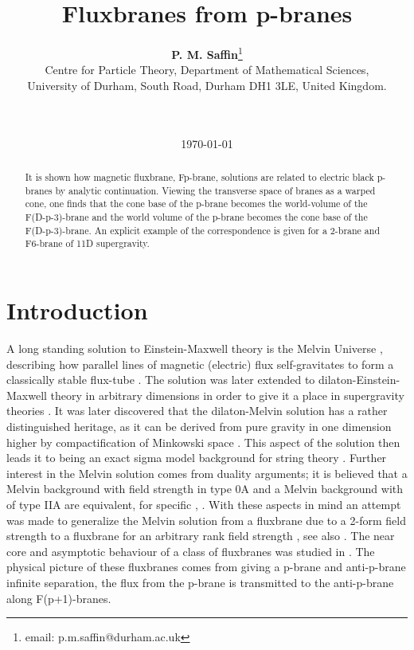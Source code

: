 \documentclass[a4paper,11pt]{article}
\title{{\bf Fluxbranes from p-branes}}
\author{{\bf P. M. Saffin}\thanks{email: p.m.saffin@durham.ac.uk}
\\ Centre for Particle Theory, Department of Mathematical Sciences, \\
University of Durham, South Road, Durham DH1 3LE, 
United Kingdom.\\
\\ \\ 
}
\date{\today}
\begin{document}
\maketitle
\begin{abstract}
It is shown how
magnetic fluxbrane, Fp-brane, solutions 
are related to electric
black p-branes by analytic continuation. Viewing 
the transverse space of branes as a warped cone, one finds that
the cone base of the p-brane
becomes the world-volume of the F(D-p-3)-brane and the
world volume of the p-brane becomes the cone base of
the F(D-p-3)-brane.
An explicit
example of the correspondence is given for a 2-brane  and
F6-brane of 11D supergravity.
\end{abstract}


\section{Introduction}

A long standing solution to Einstein-Maxwell theory is the Melvin
Universe \cite{melvin64},
describing how parallel lines of magnetic (electric)
flux self-gravitates to form a classically stable flux-tube
\cite{thorne65}.
The solution was later extended to dilaton-Einstein-Maxwell
theory in arbitrary dimensions
in order to give it a place in supergravity theories
\cite{gibbons88}. 
It was later discovered that the dilaton-Melvin solution has
a rather distinguished heritage, as it can be derived from pure
gravity in one dimension higher by compactification of Minkowski
space \cite{dowker94}. This aspect of the solution then leads
it to being an exact sigma model background for string theory
\cite{tseytlin95}. Further interest in the Melvin solution comes
from duality arguments; it is
believed that a Melvin background with field strength \coordHE{}
in type 0A and a Melvin
background with \coordHE{} of type IIA are equivalent, for specific
\coordHE{}, \coordHE{} \cite{0AIIA}.
With these aspects in mind an attempt was made to generalize the
Melvin solution from a fluxbrane due to a 2-form field strength to
a fluxbrane for an arbitrary rank field strength \cite{saffin01},
see also \cite{galtsov99}.
The near core and asymptotic behaviour of a
class of fluxbranes was studied in \cite{gutperle01}.
The physical picture of these fluxbranes comes from giving a
p-brane and anti-p-brane infinite separation, the flux from the
p-brane is transmitted to the anti-p-brane along F(p+1)-branes.
\end{document}
